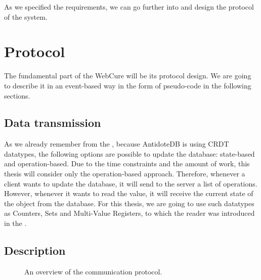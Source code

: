 As we specified the requirements, we can go further into and design the protocol of the system.

\section{Protocol}
\label{4-protocol}

The fundamental part of the WebCure will be its protocol design. We are going to describe it in an event-based way in the form of pseudo-code in the following sections. 


\subsection{Data transmission}

As we already remember from the , because AntidoteDB is using CRDT datatypes, the following options are possible to update the database: state-based and operation-based. Due to the time constraints and the amount of work, this thesis will consider only the operation-based approach. Therefore, whenever a client wants to update the database, it will send to the server a list of operations. However, whenever it wants to read the value, it will receive the current state of the object from the database. For this thesis, we are going to use such datatypes as Counters, Sets and Multi-Value Registers, to which the reader was introduced in the .

\subsection{Description} 

\begin{figure}[!htb]
    \begin{center}
    \def\svgwidth{0.6\linewidth}
    
    \caption {An overview of the communication protocol.}
    \label{fig:protocol1}
\end{center}
\end{figure}

